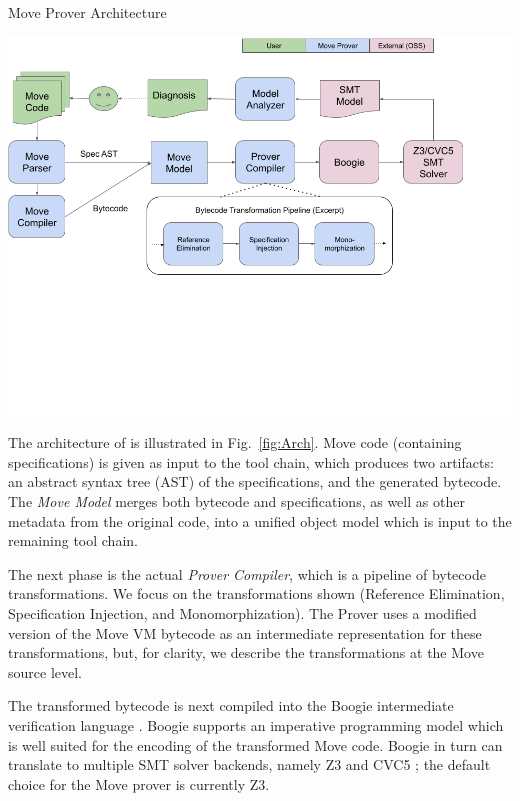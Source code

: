 
\begin{Figure}
  \centering
  \caption{Move Prover Architecture}
  \label{fig:Arch}
  \includegraphics[trim=0 250 0 0, width=\textwidth]{arch.png}
\end{Figure}

The architecture of \MVP is illustrated in Fig.~\ref{fig:Arch}. Move code
(containing specifications) is given as input to the tool chain, which
produces two artifacts: an abstract syntax tree (AST) of the specifications,
and the generated bytecode.  The \emph{Move Model} merges both bytecode and
specifications, as well as other metadata from the original code, into a
unified object model which is input to the remaining tool chain.

The next phase is the actual \emph{Prover Compiler}, which is a
pipeline of bytecode transformations. We focus on the
transformations shown (Reference Elimination, Specification Injection, and
Monomorphization).
The Prover uses a modified version of the Move VM bytecode as an intermediate
representation for these transformations, but, for clarity,
we describe the transformations at the Move source level.

The transformed bytecode is next compiled into the Boogie intermediate
verification language \cite{BOOGIE}. Boogie supports an imperative programming
model which is well suited for the encoding of the transformed Move code. Boogie
in turn can translate to multiple SMT solver backends, namely Z3 \cite{Z3} and
CVC5 \cite{CVC}; the default choice for the Move prover is currently Z3.

